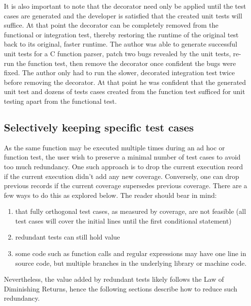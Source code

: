 It is also important to note that the decorator need only be applied until the 
test cases are generated and the developer is satisfied that the created unit
tests will suffice.  At that point the decorator can be completely removed
from the functional or integration test, thereby restoring the runtime of
the original test back to its original, faster runtime.  The author 
was able to generate successful unit tests for a C function parser, patch two
bugs revealed by the unit tests, re-run the function test, then remove 
the decorator once confident the bugs were fixed.  The author only had to run 
the slower, decorated integration test twice before removing the decorator.
At that point he was confident that the generated unit test and dozens of 
tests cases created from the function test sufficed for unit testing apart 
from the functional test.

\subsection{Selectively keeping specific test cases}\label{sec:tuning-1}
As the same function may be executed multiple times during an ad hoc or 
function test, the user wish to preserve a minimal number of test cases to 
avoid too much redundancy.  One such approach is to drop the current execution
reord if the current execution didn’t add any new coverage.  
Conversely, one can drop previous records if the current coverage supersedes previous coverage.
There are a few ways to do this as explored below. The reader should bear in mind:


\begin{enumerate}
  \item that fully orthogonal test cases, as measured by coverage, are not feasible 
  (all test cases will cover the initial lines until the first conditional statement) 
  \item redundant tests can still hold value
  \item some code such as function calls 
  and regular expressions may have one line in source code, but multiple branches in the 
  underlying library or machine code.
\end{enumerate}

Nevertheless, the value added by redundant tests
likely follows the Law of Diminishing Returns, hence the following sections
describe how to reduce such redundancy.
 
